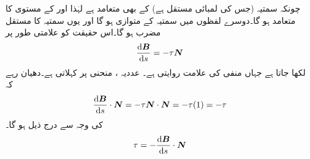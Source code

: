 چونکہ  سمتیہ   (جس کی لمبائی مستقل ہے)  کے  بھی متعامد ہے لہٰذا  اور  کے مستوی کا   متعامد ہو گا۔دوسرے لفظوں میں   سمتیہ  کے متوازی ہو گا اور یوں  سمتیہ  کا مستقل مضرب ہو گا۔اس حقیقت کو علامتی  طور پر
\begin{align*}
\frac{\dif\kvec{B}}{\dif s}=-\tau\kvec{N}
\end{align*}
لکھا جاتا ہے جہاں منفی کی علامت روایتی ہے۔ عددیہ ،  منحنی پر   کہلاتی ہے۔دھیان رہے  کہ
\begin{align*}
\frac{\dif\kvec{B}}{\dif s}\cdot\kvec{N}=-\tau\kvec{N}\cdot\kvec{N}=-\tau(1)=-\tau
\end{align*} 
کی وجہ سے درج ذیل ہو گا۔
\begin{align*}
\tau=-\frac{\dif\kvec{B}}{\dif s}\cdot\kvec{N}
\end{align*}

